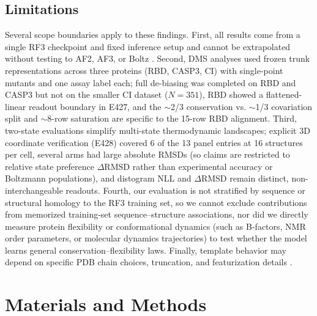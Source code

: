 \documentclass[10pt,a4paper]{article}
\begin{document}
\subsection{Limitations}
Several scope boundaries apply to these findings. First, all results come from a single RF3 checkpoint and fixed inference setup and cannot be extrapolated without testing to AF2, AF3, or Boltz \citep{jumper2021highly,abramson2024accurate,kovalevskiy2024alphafold}. Second, DMS analyses used frozen trunk representations across three proteins (RBD, CASP3, CI) with single-point mutants and one assay label each; full de-biasing was completed on RBD and CASP3 but not on the smaller CI dataset ($N=351$), RBD showed a flattened-linear readout boundary in E427, and the $\sim$2/3 conservation vs. $\sim$1/3 covariation split and $\sim$8-row saturation are specific to the 15-row RBD alignment. Third, two-state evaluations simplify multi-state thermodynamic landscapes; explicit 3D coordinate verification (E428) covered 6 of the 13 panel entries at 16 structures per cell, several arms had large absolute RMSDs (so claims are restricted to relative state preference $\Delta\mathrm{RMSD}$ rather than experimental accuracy or Boltzmann populations), and distogram NLL and $\Delta\mathrm{RMSD}$ remain distinct, non-interchangeable readouts. Fourth, our evaluation is not stratified by sequence or structural homology to the RF3 training set, so we cannot exclude contributions from memorized training-set sequence--structure associations, nor did we directly measure protein flexibility or conformational dynamics (such as B-factors, NMR order parameters, or molecular dynamics trajectories) to test whether the model learns general conservation--flexibility laws. Finally, template behavior may depend on specific PDB chain choices, truncation, and featurization details \citep{watson2023novo}.

\section{Materials and Methods}
\end{document}
